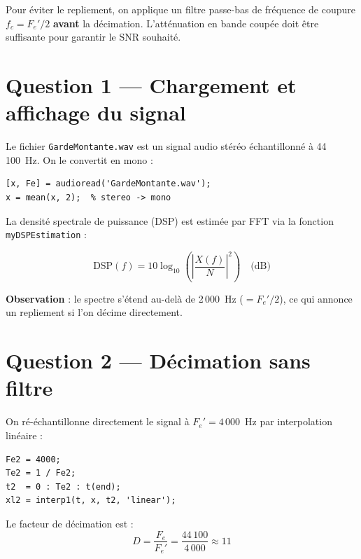 \documentclass[12pt,a4paper]{article}
\begin{document}
Pour \'eviter le repliement, on applique un filtre passe-bas de fr\'equence de
coupure $f_c = F_e'/2$ \textbf{avant} la d\'ecimation. L'att\'enuation en bande
coup\'ee doit \^etre suffisante pour garantir le SNR souhait\'e.

\section{Question 1 --- Chargement et affichage du signal}

Le fichier \texttt{GardeMontante.wav} est un signal audio st\'er\'eo
\'echantillonn\'e \`a 44\,100~Hz. On le convertit en mono :

\begin{lstlisting}
[x, Fe] = audioread('GardeMontante.wav');
x = mean(x, 2);  % stereo -> mono
\end{lstlisting}

La densit\'e spectrale de puissance (DSP) est estim\'ee par FFT via la fonction
\texttt{myDSPEstimation} :

\begin{equation}
    \text{DSP}(f) = 10\log_{10}\!\left(\left|\frac{X(f)}{N}\right|^2\right) \quad \text{(dB)}
\end{equation}

\textbf{Observation} : le spectre s'\'etend au-del\`a de 2\,000~Hz ($= F_e'/2$),
ce qui annonce un repliement si l'on d\'ecime directement.

\section{Question 2 --- D\'ecimation sans filtre}

On r\'e-\'echantillonne directement le signal \`a $F_e' = 4\,000$~Hz par
interpolation lin\'eaire :

\begin{lstlisting}
Fe2 = 4000;
Te2 = 1 / Fe2;
t2  = 0 : Te2 : t(end);
xl2 = interp1(t, x, t2, 'linear');
\end{lstlisting}

Le facteur de d\'ecimation est :
\begin{equation}
    D = \frac{F_e}{F_e'} = \frac{44\,100}{4\,000} \approx 11
\end{equation}
\end{document}
